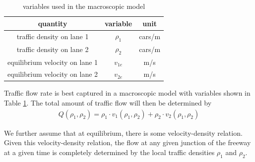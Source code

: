 \begin{table}[h]
	\begin{tabular}{|c|c|c|} \hline
	quantity & variable & unit \\ \hline
	traffic density on lane 1 & $\rho_1$ & cars/m \\ \hline
	traffic density on lane 2 & $\rho_2$ & cars/m \\ \hline
	equilibrium velocity on lane 1 & $v_{1e}$ & m/s \\ \hline
	equilibrium velocity on lane 2 & $v_{2e}$ & m/s \\ \hline
	\end{tabular}
	\caption{ variables used in the macroscopic model \label{tab:variables} }
	\end{table}	 
	Traffic flow rate is best captured in a macroscopic model with variables shown in Table \ref{tab:variables}. The total amount of traffic flow will then be determined by
	\begin{align}
	& Q(\rho_1,\rho_2) = \rho_1\cdot v_1(\rho_1,\rho_2)+\rho_2\cdot v_2(\rho_1,\rho_2) & \label{eq:flow}
	\end{align}
	
	We further assume that at equilibrium, there is some velocity-density relation. Given this velocity-density relation, the flow at any given junction of the freeway at a given time is completely determined by the local traffic densities $\rho_1$ and $\rho_2$.
	

	

